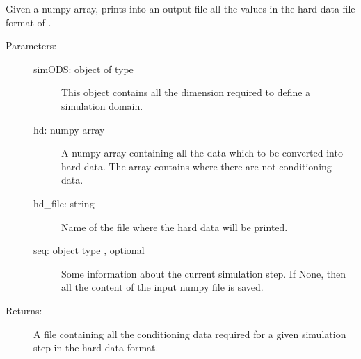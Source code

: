 \documentclass[letterpaper,10pt,english]{sphinxmanual}
\begin{document}

\begin{fulllineitems}
\label{\detokenize{appendices:s2Dcd.s2Dcd.numpy2hd4Impala}}
Given a numpy array, prints into an output file all the values in
the hard data file format of .
\begin{description}
\item[{Parameters:}] \leavevmode\begin{description}
\item[{simODS: object of type }] \leavevmode
This object contains all the dimension required to define a
simulation domain.

\item[{hd: numpy array}] \leavevmode
A numpy array containing all the data which to be
converted into hard data. The array contains
 where there are not conditioning data.

\item[{hd\_file: string}] \leavevmode
Name of the file where the hard data will be printed.

\item[{seq: object type {\hyperref[\detokenize{appendices:s2Dcd.s2Dcd.SeqStep}]{}}, optional}] \leavevmode
Some information about the current simulation step. 
If None, then all the  content of the input
numpy file is saved.

\end{description}

\item[{Returns:}] \leavevmode
A file containing all the conditioning data required for a given
simulation step in the  hard data format.

\end{description}

\end{fulllineitems}

\end{document}
